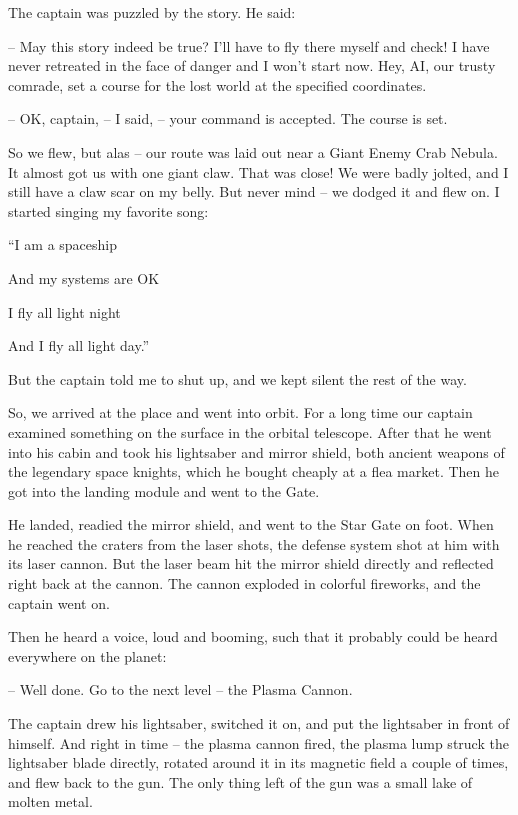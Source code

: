 \documentclass[ebook,oneside,final,openright]{memoir}
\begin{document}
\par
The captain was puzzled by the story. He said:\par
– May this story indeed be true? I’ll have to fly there myself and check! I have never retreated in the face of danger and I won’t start now. Hey, AI, our trusty comrade, set a course for the lost world at the specified coordinates.\par
– OK, captain, – I said, – your command is accepted. The course is set.\par
So we flew, but alas – our route was laid out near a Giant Enemy Crab Nebula. It almost got us with one giant claw. That was close! We were badly jolted, and I still have a claw scar on my belly. But never mind – we dodged it and flew on. I started singing my favorite song: \par
“I am a spaceship \par
 And my systems are OK \par
 I fly all light night \par
 And I fly all light day.”\par
 But the captain told me to shut up, and we kept silent the rest of the way.\par
\par
So, we arrived at the place and went into orbit. For a long time our captain examined something on the surface in the orbital telescope. After that he went into his cabin and took his lightsaber and mirror shield, both ancient weapons of the legendary space knights, which he bought cheaply at a flea market. Then he got into the landing module and went to the Gate.\par
\par
He landed, readied the mirror shield, and went to the Star Gate on foot. When he reached the craters from the laser shots, the defense system shot at him with its laser cannon. But the laser beam hit the mirror shield directly and reflected right back at the cannon. The cannon exploded in colorful fireworks, and the captain went on.\par
\par
Then he heard a voice, loud and booming, such that it probably could be heard everywhere on the planet:\par
– Well done. Go to the next level – the Plasma Cannon.\par
The captain drew his lightsaber, switched it on, and put the lightsaber in front of himself. And right in time – the plasma cannon fired, the plasma lump struck the lightsaber blade directly, rotated around it in its magnetic field a couple of times, and flew back to the gun. The only thing left of the gun was a small lake of molten metal.\par
\end{document}
